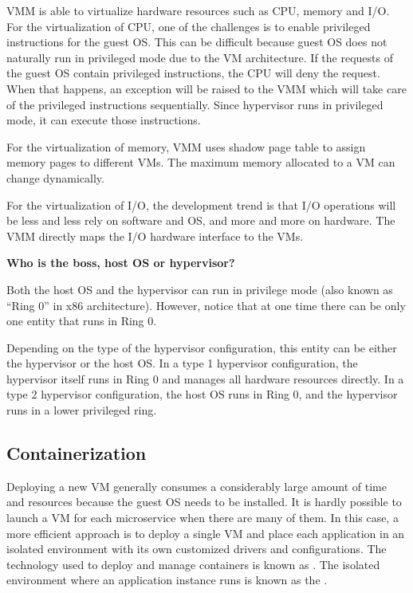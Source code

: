 VMM is able to virtualize hardware resources such as CPU, memory and I/O. For the virtualization of CPU, one of the challenges is to enable privileged instructions for the guest OS. This can be difficult because guest OS does not naturally run in privileged mode due to the VM architecture. If the requests of the guest OS contain privileged instructions, the CPU will deny the request. When that happens, an exception will be raised to the VMM which will take care of the privileged instructions sequentially. Since hypervisor runs in privileged mode, it can execute those instructions.

For the virtualization of memory, VMM uses shadow page table to assign memory pages to different VMs. The maximum memory allocated to a VM can change dynamically.

For the virtualization of I/O, the development trend is that I/O operations will be less and less rely on software and OS, and more and more on hardware. The VMM directly maps the I/O hardware interface to the VMs.

\begin{mdframed}
	\noindent \textbf{Who is the boss, host OS or hypervisor?}
	
	Both the host OS and the hypervisor can run in privilege mode (also known as ``Ring 0'' in x86 architecture). However, notice that at one time there can be only one entity that runs in Ring 0.
	
	Depending on the type of the hypervisor configuration, this entity can be either the hypervisor or the host OS. In a type 1 hypervisor configuration, the hypervisor itself runs in Ring 0 and manages all hardware resources directly. In a type 2 hypervisor configuration, the host OS runs in Ring 0, and the hypervisor runs in a lower privileged ring.
\end{mdframed}

\subsection{Containerization}

Deploying a new VM generally consumes a considerably large amount of time and resources because the guest OS needs to be installed. It is hardly possible to launch a VM for each microservice when there are many of them. In this case, a more efficient approach is to deploy a single VM and place each application in an isolated environment with its own customized drivers and configurations. The technology used to deploy and manage containers is known as . The isolated environment where an application instance runs is known as the . 

